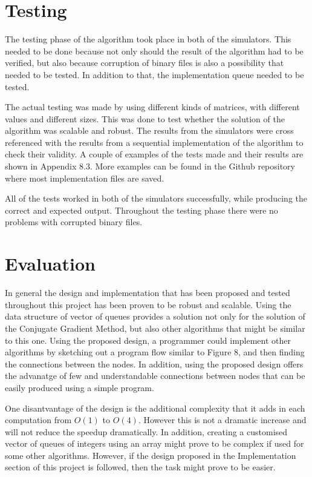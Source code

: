 \documentclass[12pt,a4paper]{article}
\begin{document}
\section{Testing}
The testing phase of the algorithm took place in both of the simulators. This needed to be done because not only should the result of the algorithm had to be verified, but also because corruption of binary files is also a possibility that needed to be tested. In addition to that, the implementation queue needed to be tested.

The actual testing was made by using different kinds of matrices, with different values and different sizes. This was done to test whether the solution of the algorithm was scalable and robust. The results from the simulators were cross referenced with the results from a sequential implementation of the algorithm to check their validity. A couple of examples of the tests made and their results are shown in Appendix 8.3. More examples can be found in the Github repository where most implementation files are saved\cite{git_repo}.

All of the tests worked in both of the simulators successfully, while producing the correct and expected output. Throughout the testing phase there were no problems with corrupted binary files.
\section{Evaluation}
In general the design and implementation that has been proposed and tested throughout this project has been proven to be robust and scalable. Using the data structure of vector of queues provides a solution not only for the solution of the Conjugate Gradient Method, but also other algorithms that might be similar to this one. Using the proposed design, a programmer could implement other algorithms by sketching out a program flow similar to Figure 8, and then finding the connections between the nodes. In addition, using the proposed design offers the advanatge of few and understandable connections between nodes that can be easily produced using a simple program.

One disantvantage of the design is the additional complexity that it adds in each computation from $O(1)$ to $O(4)$. However this is not a dramatic increase and will not reduce the speedup dramatically. In addition, creating a customised vector of queues of integers using an array might prove to be complex if used for some other algorithms. However, if the design proposed in the Implementation section of this project is followed, then the task might prove to be easier.
\end{document}
